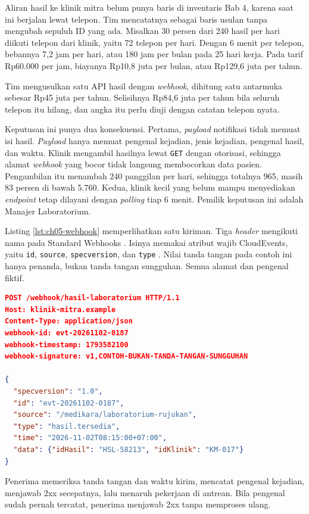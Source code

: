 \begin{kasus}[title={Kasus Medikara Health: Hasil Laboratorium bagi Klinik Mitra}]
Aliran hasil ke klinik mitra belum punya baris di inventaris Bab 4, karena saat ini berjalan lewat telepon. Tim mencatatnya sebagai
baris usulan tanpa mengubah sepuluh ID yang ada. Misalkan 30 persen dari 240 hasil per hari diikuti telepon dari klinik, yaitu 72
telepon per hari. Dengan 6 menit per telepon, bebannya 7,2 jam per hari, atau 180 jam per bulan pada 25 hari kerja. Pada tarif
Rp60.000 per jam, biayanya Rp10,8 juta per bulan, atau Rp129,6 juta per tahun.

Tim mengusulkan satu API hasil dengan \textit{webhook}, dihitung satu antarmuka sebesar Rp45 juta per tahun. Selisihnya Rp84,6 juta per
tahun bila seluruh telepon itu hilang, dan angka itu perlu diuji dengan catatan telepon nyata.

Keputusan ini punya dua konsekuensi. Pertama, \textit{payload} notifikasi tidak memuat isi hasil. \textit{Payload} hanya memuat pengenal
kejadian, jenis kejadian, pengenal hasil, dan waktu. Klinik mengambil hasilnya lewat \texttt{GET} dengan otorisasi, sehingga alamat
\textit{webhook} yang bocor tidak langsung membocorkan data pasien. Pengambilan itu menambah 240 panggilan per hari, sehingga totalnya
965, masih 83 persen di bawah 5.760. Kedua, klinik kecil yang belum mampu menyediakan \textit{endpoint} tetap dilayani dengan
\textit{polling} tiap 6 menit. Pemilik keputusan ini adalah Manajer Laboratorium.
\end{kasus}

\begin{pendalaman}[title={Pendalaman Teknis (opsional): Isi Satu Kiriman Webhook}]
Listing \ref{lst:ch05-webhook} memperlihatkan satu kiriman. Tiga \textit{header} mengikuti nama pada Standard Webhooks
\cite{c05-standardwebhooks}. Isinya memakai atribut wajib CloudEvents, yaitu \texttt{id}, \texttt{source}, \texttt{specversion}, dan
\texttt{type} \cite{c05-cloudevents}. Nilai tanda tangan pada contoh ini hanya penanda, bukan tanda tangan sungguhan. Semua alamat dan
pengenal fiktif.

\begin{lstlisting}[language=json, xleftmargin=8pt, caption={Kiriman \textit{webhook} hasil tersedia, tersedia di \berkas{sources/chapter05/contoh-webhook.md}}, label={lst:ch05-webhook}]
POST /webhook/hasil-laboratorium HTTP/1.1
Host: klinik-mitra.example
Content-Type: application/json
webhook-id: evt-20261102-0187
webhook-timestamp: 1793582100
webhook-signature: v1,CONTOH-BUKAN-TANDA-TANGAN-SUNGGUHAN

{
  "specversion": "1.0",
  "id": "evt-20261102-0187",
  "source": "/medikara/laboratorium-rujukan",
  "type": "hasil.tersedia",
  "time": "2026-11-02T08:15:00+07:00",
  "data": {"idHasil": "HSL-58213", "idKlinik": "KM-017"}
}
\end{lstlisting}

Penerima memeriksa tanda tangan dan waktu kirim, mencatat pengenal kejadian, menjawab 2xx secepatnya, lalu menaruh pekerjaan di antrean.
Bila pengenal sudah pernah tercatat, penerima menjawab 2xx tanpa memproses ulang.
\end{pendalaman}

